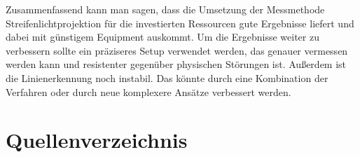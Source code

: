\documentclass[ngerman,a4paper,parskip=half]{scrartcl}
\begin{document}
Zusammenfassend kann man sagen, dass die Umsetzung der Messmethode Streifenlichtprojektion für die investierten Ressourcen gute Ergebnisse liefert und dabei mit günstigem Equipment auskommt.
Um die Ergebnisse weiter zu verbessern sollte ein präziseres Setup verwendet werden, das genauer vermessen werden kann und resistenter gegenüber physischen Störungen ist. Außerdem ist die Linienerkennung noch instabil. Das könnte durch eine Kombination der Verfahren oder durch neue komplexere Ansätze verbessert werden.


\newpage

\section{Quellenverzeichnis}




\nocite{Haeming10sfm}
\nocite{Tomasi98stereomatching}
\nocite{manfred81math}
\nocite{opencv}
\nocite{particle}


\renewcommand{\section}[2]{}



\end{document}
